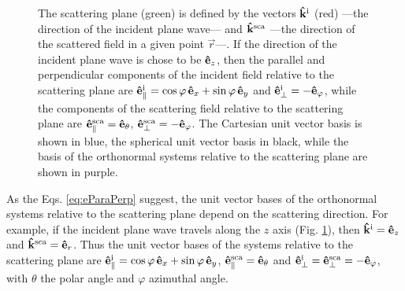 \begin{figure}[!bht]\centering
	
    \caption[Scattering plane unit vector systems]{The scattering plane (green) is defined by the vectors $\vu{k}^\text{i}$ (red) ---the direction of the incident plane wave--- and $\vu{k}^\text{sca}$ ---the direction of the scattered field in a given point $\vec{r}$---. If the direction of the incident plane wave is chose to be $\vu{e}_z$, then the parallel and perpendicular components of the incident field relative to the scattering plane are $\vu{e}_\parallel^\text{i} = \cos\varphi\,\vu{e}_x +\sin\varphi\,\vu{e}_y$ and  $\vu{e}_\perp^\text{i} = -\vu{e}_\varphi$, while the components of the scattering field relative to the scattering plane are $\vu{e}_\parallel^\text{sca} = \vu{e}_\theta$, $\vu{e}_\perp^\text{sca} = - \vu{e}_\varphi$. The Cartesian unit vector basis is shown in blue, the spherical unit vector basis in black, while the basis of the orthonormal systems relative to the scattering plane are shown in purple. }
    \label{fig:ScatPlane}
\end{figure}

\noindent
As the Eqs. \eqref{eq:eParaPerp} suggest, the unit vector bases of the orthonormal systems relative to the scattering plane depend on the scattering direction. For example, if the incident plane wave travels along the $z$ axis (Fig. \ref{fig:ScatPlane}), then $\vu{k}^\text{i} = \vu{e}_z$ and $\vu{k}^\text{sca} = \vu{e}_r$. Thus the unit vector bases of the systems relative to the scattering plane are   $\vu{e}_\parallel^\text{i} = \cos\varphi\, \vu{e}_x +\sin\varphi\, \vu{e}_y$, $\vu{e}_\parallel^\text{sca} = \vu{e}_\theta$ and $\vu{e}_\perp^\text{i} = \vu{e}_\perp^\text{sca}  = - \vu{e}_\varphi$, with $\theta$ the polar angle and $\varphi$ azimuthal angle.

